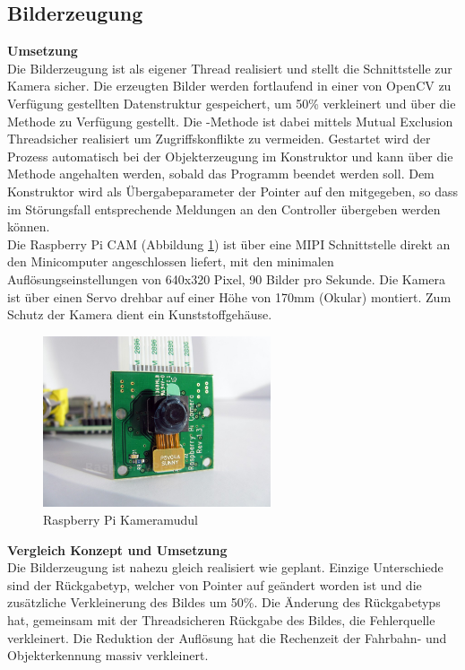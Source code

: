 \subsection{Bilderzeugung}
\textbf{Umsetzung}\\[0.2cm]
Die Bilderzeugung ist als eigener Thread realisiert und stellt die Schnittstelle zur Kamera sicher. Die erzeugten Bilder werden fortlaufend in einer von OpenCV zu Verfügung gestellten Datenstruktur  gespeichert, um 50\% verkleinert und über die  Methode  zu Verfügung gestellt. Die -Methode ist dabei mittels Mutual Exclusion Threadsicher realisiert um Zugriffskonflikte zu vermeiden. Gestartet wird der Prozess automatisch bei der Objekterzeugung im Konstruktor und kann über die Methode  angehalten werden, sobald das Programm beendet werden soll. Dem Konstruktor wird als Übergabeparameter der Pointer auf den  mitgegeben, so dass im Störungsfall entsprechende Meldungen an den Controller übergeben werden können.\\
Die Raspberry Pi CAM (Abbildung \ref{fig:camera}) ist über eine MIPI Schnittstelle direkt an den Minicomputer angeschlossen liefert, mit den minimalen Auflösungseinstellungen von 640x320 Pixel, 90 Bilder pro Sekunde. Die Kamera ist über einen Servo drehbar auf einer Höhe von 170mm (Okular) montiert. Zum Schutz der Kamera dient ein Kunststoffgehäuse. 
\begin{figure}[H]
\centering
\includegraphics[width=0.6\textwidth]{03_Loesungskonzept/pictures/raspberry-pi-camera-module.jpg}
\caption{Raspberry Pi Kameramudul}
\label{fig:camera}
\end{figure}
\textbf{Vergleich Konzept und Umsetzung}\\[0.2cm]
Die Bilderzeugung ist nahezu gleich realisiert wie geplant. Einzige Unterschiede sind der Rückgabetyp, welcher von Pointer auf  geändert worden ist und die zusätzliche Verkleinerung des Bildes um 50\%. Die Änderung des Rückgabetyps hat, gemeinsam mit der Threadsicheren Rückgabe des Bildes, die Fehlerquelle verkleinert. Die Reduktion der Auflösung hat die Rechenzeit der Fahrbahn- und Objekterkennung massiv verkleinert.\\[0.2cm]
